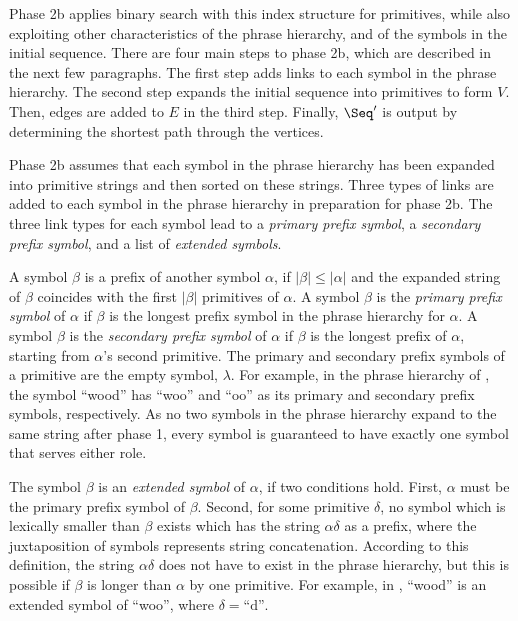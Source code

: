 Phase 2b applies binary search with this index structure for primitives,
while also
exploiting other characteristics of the phrase hierarchy, and of
the symbols in the initial sequence.
There are four main steps to \remerge phase 2b, which are described
in the next few paragraphs.  The first step adds 
links to each symbol in the phrase hierarchy.  
The second step expands the initial sequence into 
primitives to form $V$.  Then, edges are added to $E$ in the
third step.  Finally, $\Seq'$ is output by 
determining the shortest path through the vertices.


Phase 2b assumes that each symbol in the phrase hierarchy
has been expanded into primitive strings and then
sorted on these strings.  
Three types of links are added to each symbol in the phrase 
hierarchy in preparation for phase 2b.  The three link types
for each symbol lead to a {\emph {primary prefix symbol}}, 
a {\emph {secondary prefix symbol}}, and a list of 
{\emph {extended symbols}}.

A symbol $\beta$ is a prefix of 
another symbol $\alpha$, if $|\beta| \leq |\alpha|$ and
the expanded string of $\beta$ coincides with the first 
$|\beta|$ primitives of $\alpha$.  A symbol $\beta$ 
is the {\emph {primary prefix symbol}} of $\alpha$ if $\beta$ is
the longest prefix symbol in the phrase hierarchy for $\alpha$.
A symbol $\beta$ is the {\emph {secondary prefix symbol}} 
of $\alpha$ if $\beta$
is the longest prefix of $\alpha$, starting from $\alpha$'s second 
primitive.  The primary and secondary prefix symbols of a primitive
are the empty symbol, $\lambda$.  
For example, in the phrase hierarchy of
, the symbol
``wood'' has ``woo'' and ``oo'' as its primary and secondary prefix
symbols, respectively.
As no two symbols in the phrase hierarchy expand to the 
same string after phase 1, 
every symbol is guaranteed to have exactly one symbol that 
serves either role.

The symbol $\beta$ is an {\emph {extended symbol}} of $\alpha$, if 
two conditions hold.  First, $\alpha$ must be the primary 
prefix symbol of $\beta$.  Second, for some primitive 
$\delta$, no symbol which is lexically smaller than $\beta$
exists which has the string $\alpha$$\delta$
as a prefix, where the juxtaposition of symbols represents string
concatenation.  According to this definition, the string $\alpha$$\delta$
does not have to exist in the phrase hierarchy, but this is possible
if $\beta$ is longer than $\alpha$ by one primitive.  For example, 
in , ``wood'' is an extended
symbol of ``woo'', where $\delta = \textrm{``d''}$.  

